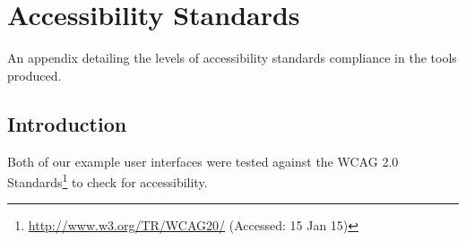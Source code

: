\chapter{Accessibility Standards} 
\label{App:Accessibility Standards}

\begin{preamble}
An appendix detailing the levels of accessibility standards compliance in the tools produced.
\end{preamble}

\section{Introduction}

Both of our example user interfaces were tested against the \gls{WCAG} 2.0 Standards\footnote{\url{http://www.w3.org/TR/WCAG20/} (Accessed: 15 Jan 15)} to check for accessibility.


